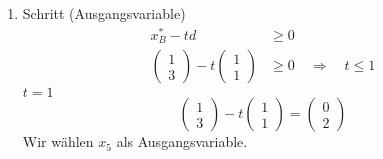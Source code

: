 \documentclass[a4paper]{scrartcl}
\begin{document}
\begin{enumerate}[label=\bfseries\arabic*.]
\begin{enumerate}[1.]
\begin{enumerate}[1.]
                    \item Schritt (Ausgangsvariable)
                        \begin{equation}
                            \begin{split}
                                x_B^* - td &\geq 0 \\
                                \begin{pmatrix}
                                    1 \\ 3
                                \end{pmatrix}
                                - t
                                \begin{pmatrix}
                                    1 \\ 1
                                \end{pmatrix}
                                &\geq 0
                                \quad\Rightarrow\quad
                                t \leq 1
                            \end{split}
                        \end{equation}
                        $t = 1$
                        \begin{equation}
                            \begin{pmatrix}
                                1 \\ 3
                            \end{pmatrix}
                            - t
                            \begin{pmatrix}
                                1 \\ 1
                            \end{pmatrix}
                            =
                            \begin{pmatrix}
                                0 \\ 2
                            \end{pmatrix}
                        \end{equation}
                        Wir wählen $x_5$ als Ausgangsvariable.


\end{enumerate}
\end{enumerate}
\end{enumerate}
\end{document}
